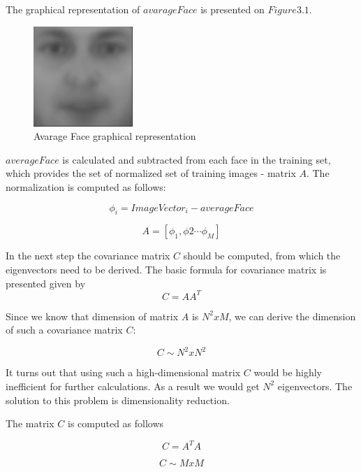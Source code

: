 The graphical representation of $avarageFace$ is presented on $Figure 3.1$.

\begin{figure}[H]
\centering
\includegraphics[scale=1]{avarage_face.jpg}
\caption{Avarage Face graphical representation}
\end{figure} 

$averageFace$ is calculated and subtracted from each face in the training set, which provides the set of normalized set of training images - matrix $A$. The normalization is computed as follows:

\begin{equation}
\phi_{i} = ImageVector_{i} - averageFace
\end{equation}

\begin{equation}
A = [\phi_{1}, \phi{2} \cdots \phi_{M}]
\end{equation}
 
In the next step the covariance matrix $C$ should be computed, from which the eigenvectors need to be derived. The basic formula for covariance matrix is presented given by 
 \begin{equation}
 C= AA^{T}
 \end{equation}
 
Since we know that dimension of matrix $A$ is $N^{2} x M$, we can derive the dimension of such a covariance matrix $C$: 

 \begin{equation}
 C \sim N^{2} x N^{2}
 \end{equation}

It turns out that using such a high-dimensional matrix $C$ would be highly inefficient for further calculations. As a result we would get $N^{2}$ eigenvectors. The solution to this problem is dimensionality reduction.

The matrix $C$ is computed as follows

 \begin{equation}
 C= A^{T}A
\end{equation}

 \begin{equation}
 C \sim M x M
\end{equation}

